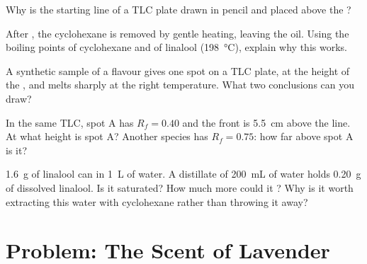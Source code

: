 \begin{exercise}[$\star\star$]\label{exo:g10:chemical-species:11}
Why is the starting line of a TLC plate drawn in pencil and placed above
the ?
\end{exercise}

\begin{exercise}[$\star\star\star$]\label{exo:g10:chemical-species:12}
After , the cyclohexane is removed by gentle heating, leaving
the oil. Using the boiling points of cyclohexane and of linalool (\qty{198}{\celsius}), explain
why this works.
\end{exercise}

\begin{exercise}[$\star\star\star$]\label{exo:g10:chemical-species:13}
A synthetic sample of a flavour gives one spot on a TLC plate, at the
height of the , and melts sharply at the right
temperature. What two conclusions can you draw?
\end{exercise}

\begin{exercise}[$\star\star\star$]\label{exo:g10:chemical-species:14}
In the same TLC, spot A has $R_f = 0.40$ and the front is \qty{5.5}{cm}
above the line. At what height is spot A? Another species has
$R_f = 0.75$: how far above spot A is it?
\end{exercise}

\begin{exercise}[$\star\star\star$]\label{exo:g10:chemical-species:15}
\qty{1.6}{g} of linalool can  in \qty{1}{L} of water. A distillate
of \qty{200}{mL} of water holds \qty{0.20}{g} of dissolved linalool. Is it
saturated? How much more could it ? Why is it worth extracting
this water with cyclohexane rather than throwing it away?
\end{exercise}

\clearpage %
\section{Problem: The Scent of Lavender}

